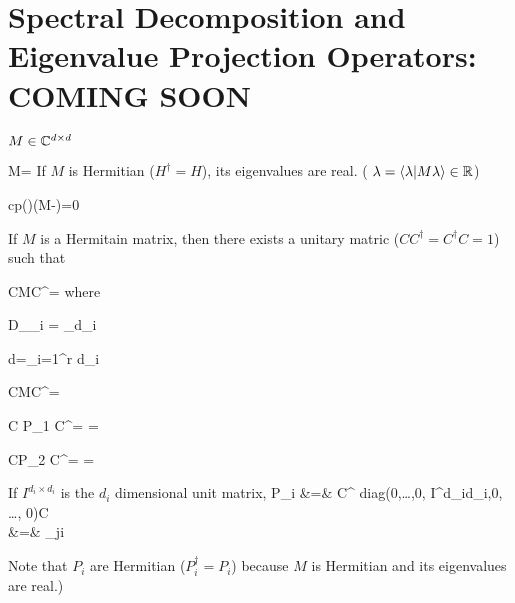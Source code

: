 \chapter{Spectral Decomposition and Eigenvalue Projection Operators: COMING SOON}
\label{ch-spectral-decom}

$M\in { \mathbb{C}}^{d\times d }$

\beq
M=\lam {}
\eeq
If $M$ is Hermitian ($H^\dagger=H$), its eigenvalues are real. ( $\lambda =
\left\langle\lambda|M\lambda\right\rangle\in{ \mathbb{R}}$)


\beq
cp(\lam)\eqdef \det(M-\lam)=0
\eeq

If $M$ is a Hermitain  matrix, then there exists
a unitary matric ($CC^\dagger = C^\dagger C =1$)
such that

\beq
CMC^\dagger=
\eeq
where

\beq
D_{\lam_i} =
_{d_i}
\eeq

\beq
d=\sum_{i=1}^r d_i
\eeq


\beq
CMC^\dagger =
\eeq

\beq
C P_1 C^\dagger=
\left[
\begin{array}{cc}
1&0
\\
0&0
\end{array}
\right]
=
\eeq

\beq
CP_2 C^\dagger =
\left[
\begin{array}{cc}
0&0
\\
0&1
\end{array}
\right]
=
\eeq

If $I^{d_i\times d_i}$
is the $d_i$
dimensional unit matrix,
\beqa
P_i &=&
C^\dagger
diag(0,\ldots,0, I^{d_i\times d_i},0, \dots, 0)C
\\
&=&
\prod_{j\neq i}
\eeqa

Note that $P_i$ are Hermitian
($P_i^\dagger = P_i$)
because $M$
is Hermitian and
its eigenvalues are real.)

